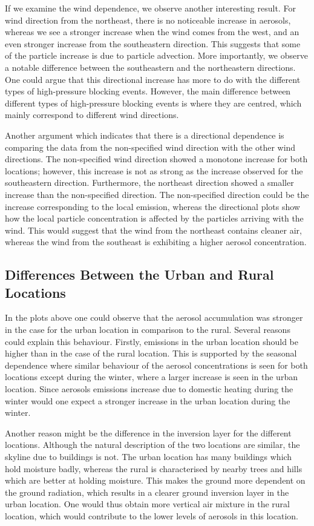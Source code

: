 If we examine the wind dependence, we observe another interesting result. For wind direction from the northeast, there is no noticeable increase in aerosols, whereas we see a stronger increase when the wind comes from the west, and an even stronger increase from the southeastern direction. This suggests that some of the particle increase is due to particle advection. More importantly, we observe a notable difference between the southeastern and the northeastern directions. One could argue that this directional increase has more to do with the different types of high-pressure blocking events. However, the main difference between different types of high-pressure blocking events is where they are centred, which mainly correspond to different wind directions. 

Another argument which indicates that there is a directional dependence is comparing the data from the non-specified wind direction with the other wind directions. The non-specified wind direction showed a monotone increase for both locations; however, this increase is not as strong as the increase observed for the southeastern direction. Furthermore, the northeast direction showed a smaller increase than the non-specified direction. The non-specified direction could be the increase corresponding to the local emission, whereas the directional plots show how the local particle concentration is affected by the particles arriving with the wind. This would suggest that the wind from the northeast contains cleaner air, whereas the wind from the southeast is exhibiting a higher aerosol concentration. 

\subsection{Differences Between the Urban and Rural Locations}
In the plots above one could observe that the aerosol accumulation was stronger in the case for the urban location in comparison to the rural. Several reasons could explain this behaviour. Firstly, emissions in the urban location should be higher than in the case of the rural location. This is supported by the seasonal dependence where similar behaviour of the aerosol concentrations is seen for both locations except during the winter, where a larger increase is seen in the urban location. Since aerosols emissions increase due to domestic heating during the winter would one expect a stronger increase in the urban location during the winter. 

Another reason might be the difference in the inversion layer for the different locations. Although the natural description of the two locations are similar, the skyline due to buildings is not. The urban location has many buildings which hold moisture badly, whereas the rural is characterised by nearby trees and hills which are better at holding moisture. This makes the ground more dependent on the ground radiation, which results in a clearer ground inversion layer in the urban location. One would thus obtain more vertical air mixture in the rural location, which would contribute to the lower levels of aerosols in this location. 

